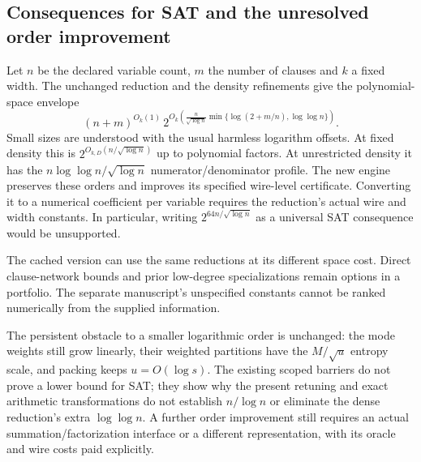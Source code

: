 \subsection{Consequences for SAT and the unresolved order improvement}

Let $n$ be the declared variable count, $m$ the number of clauses and
$k$ a fixed width. The unchanged reduction and the density refinements
give the polynomial-space envelope
\begin{equation}\label{eq:sat-envelope}
 (n+m)^{O_k(1)}\,
 2^{O_k\left(\frac n{\sqrt{\log n}}
      \min\{\log(2+m/n),\log\log n\}\right)}.
\end{equation}
Small sizes are understood with the usual harmless logarithm offsets.
At fixed density this is $2^{O_{k,D}(n/\sqrt{\log n})}$ up to polynomial
factors. At unrestricted density it has the
$n\log\log n/\sqrt{\log n}$ numerator/denominator profile. The new
engine preserves these orders and improves its specified wire-level
certificate. Converting it to a numerical coefficient per variable
requires the reduction's actual wire and width constants. In particular,
writing $2^{64n/\sqrt{\log n}}$ as a universal SAT consequence would
be unsupported.

The cached version can use the same reductions at its different space
cost. Direct clause-network bounds and prior low-degree specializations
remain options in a portfolio. The separate manuscript's unspecified
constants cannot be ranked numerically from the supplied information.

The persistent obstacle to a smaller logarithmic order is unchanged:
the mode weights still grow linearly, their weighted partitions have
the $M/\sqrt u$ entropy scale, and packing keeps $u=O(\log s)$.
The existing scoped barriers do not prove a lower bound for SAT; they
show why the present retuning and exact arithmetic transformations do
not establish $n/\log n$ or eliminate the dense reduction's extra
$\log\log n$. A further order improvement still requires an actual
summation/factorization interface or a different representation,
with its oracle and wire costs paid explicitly.
